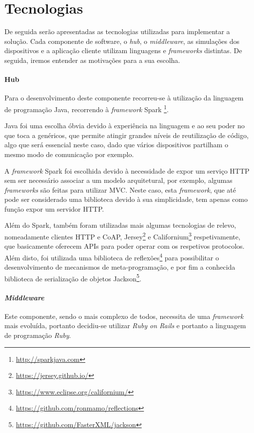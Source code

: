 \section{Tecnologias}
De seguida serão apresentadas as tecnologias utilizadas para implementar a solução. Cada componente de software, o \textit{hub}, o \textit{middleware}, as simulações dos dispositivos e a aplicação cliente utilizam linguagens e \textit{frameworks} distintas. De seguida, iremos entender as motivações para a sua escolha.

\paragraph*{Hub}
Para o desenvolvimento deste componente recorreu-se à utilização da linguagem de programação Java, recorrendo à \textit{framework} Spark \footnote{\url{http://sparkjava.com}}.

Java foi uma escolha óbvia devido à experiência na linguagem e ao seu poder no que toca a genéricos, que permite atingir grandes níveis de reutilização de código, algo que será essencial neste caso, dado que vários dispositivos partilham o mesmo modo de comunicação por exemplo.

A \textit{framework} Spark foi escolhida devido à necessidade de expor um serviço HTTP sem ser necessário associar a um modelo arquitetural, por exemplo, algumas \textit{frameworks} são feitas para utilizar MVC. Neste caso, esta \textit{framework}, que até pode ser considerado uma biblioteca devido à sua simplicidade, tem apenas como função expor um servidor HTTP.

Além do Spark, também foram utilizadas mais algumas tecnologias de relevo, nomeadamente clientes HTTP e CoAP, Jersey\footnote{\url{https://jersey.github.io/}} e Californium\footnote{\url{https://www.eclipse.org/californium/}} respetivamente, que basicamente oferecem APIs para poder operar com os respetivos protocolos.  Além disto, foi utilizada uma biblioteca de reflexões\footnote{\url{https://github.com/ronmamo/reflections}} para possibilitar o desenvolvimento de mecanismos de meta-programação, e por fim a conhecida biblioteca de serialização de objetos Jackson\footnote{\url{https://github.com/FasterXML/jackson}}.

\paragraph*{\textit{Middleware}}
Este componente, sendo o mais complexo de todos, necessita de uma \textit{framework} mais evoluída, portanto decidiu-se utilizar \textit{Ruby on Rails} e portanto a linguagem de programação \textit{Ruby}.


